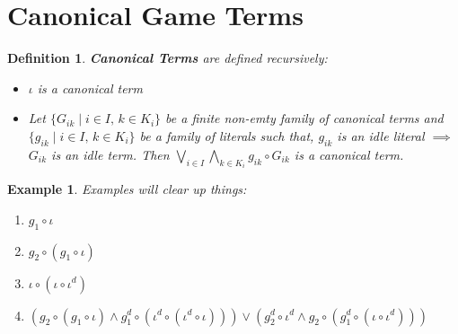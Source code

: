 \documentclass[10pt]{article}
\newcommand{\id}{\iota}
\newcommand{\com}[2]{#1 \circ #2 }
\newtheorem{definition}[theorem]{Definition}
\newtheorem{example}[theorem]{Example}
\begin{document}
	\section{Canonical Game Terms}
	\begin{definition}\textbf{Canonical Terms} are defined recursively:
		\begin{itemize}
			\item $\iota$ is a canonical term
			\item Let $\{G_{ik} \mid i\in I\text{, } k\in K_i\}$ be a finite non-emty family of canonical terms and $\{g_{ik}\mid i\in I\text{, } k\in K_i\}$ be a family of literals such that, $g_{ik}$ is an idle literal $\implies$ $G_{ik}$ is an idle term. Then $\bigvee_{i\in I} \bigwedge_{k \in K_i} g_{ik}\circ G_{ik}$ is a canonical term.
		\end{itemize}
	\end{definition}
	
	\begin{example}
		Examples will clear up things:
		\begin{enumerate}
			\item $g_1 \circ \iota$
			\item $g_2 \circ (g_1 \circ \iota)$
			\item $\iota \circ (\iota \circ \iota^d)$
			\item $(\com{g_2}{(\com{g_1}{\id})}\land \com{g_1^d}{(\com{\id^d}{(\com{\id^d}{\id})})}) \lor (g_2^d \circ \id^d \land g_2\circ (g_1^d \circ (\iota \circ \iota^d)))$
		\end{enumerate}
	\end{example}
	
\end{document}
